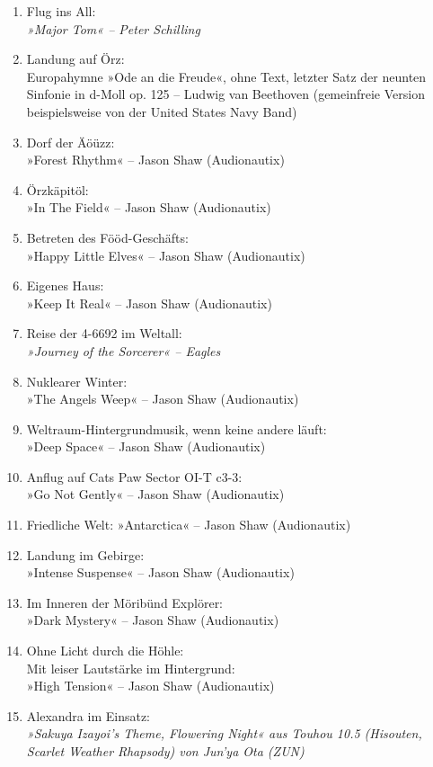 \begin{enumerate}
    \item Flug ins All:\\ \textit{»Major Tom« – Peter Schilling}
    \item Landung auf Örz:\\ Europahymne »Ode an die Freude«, ohne Text, letzter Satz der neunten Sinfonie in d-Moll op. 125 – Ludwig van Beethoven (gemeinfreie Version beispielsweise von der United States Navy Band)
    \item Dorf der Äöüzz:\\ »Forest Rhythm« – Jason Shaw (Audionautix)
    \item Örzkäpitöl:\\ »In The Field« – Jason Shaw (Audionautix)
    \item Betreten des Fööd-Geschäfts:\\ »Happy Little Elves« – Jason Shaw (Audionautix)
    \item Eigenes Haus:\\ »Keep It Real« – Jason Shaw (Audionautix)
    \item Reise der 4-6692 im Weltall:\\ \textit{»Journey of the Sorcerer« – Eagles}
    \item Nuklearer Winter:\\ »The Angels Weep« – Jason Shaw (Audionautix)
    \item Weltraum-Hintergrundmusik, wenn keine andere läuft:\\ »Deep Space« – Jason Shaw (Audionautix)
    \item Anflug auf Cats Paw Sector OI-T c3-3:\\ »Go Not Gently« – Jason Shaw (Audionautix)
    \item Friedliche Welt: »Antarctica« – Jason Shaw (Audionautix)
    \item Landung im Gebirge:\\ »Intense Suspense« – Jason Shaw (Audionautix)
    \item Im Inneren der Möribünd Explörer:\\ »Dark Mystery« – Jason Shaw (Audionautix)
    \item Ohne Licht durch die Höhle:\\ Mit leiser Lautstärke im Hintergrund:\\ »High Tension« – Jason Shaw (Audionautix)
    \item Alexandra im Einsatz:\\  \textit{»Sakuya Izayoi's Theme, Flowering Night« aus Touhou 10.5 (Hisouten, Scarlet Weather Rhapsody) von Jun'ya Ota (ZUN)}

\end{enumerate}
